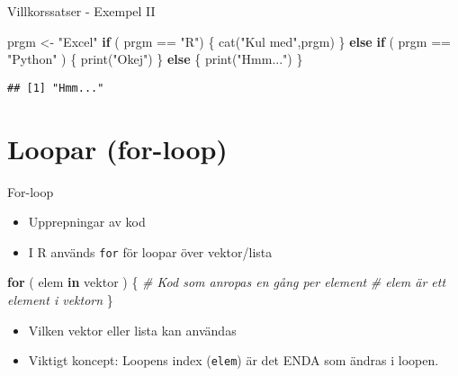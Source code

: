 \documentclass[
  11pt,
  ignorenonframetext,
]{beamer}
\newenvironment{Shaded}{\begin{snugshade}}{\end{snugshade}}
\newcommand{\CommentTok}[1]{\textcolor[rgb]{0.56,0.35,0.01}{\textit{#1}}}
\newcommand{\ControlFlowTok}[1]{\textcolor[rgb]{0.13,0.29,0.53}{\textbf{#1}}}
\newcommand{\FunctionTok}[1]{\textcolor[rgb]{0.00,0.00,0.00}{#1}}
\newcommand{\NormalTok}[1]{#1}
\newcommand{\OtherTok}[1]{\textcolor[rgb]{0.56,0.35,0.01}{#1}}
\newcommand{\SpecialCharTok}[1]{\textcolor[rgb]{0.00,0.00,0.00}{#1}}
\newcommand{\StringTok}[1]{\textcolor[rgb]{0.31,0.60,0.02}{#1}}
\providecommand{\tightlist}{%
  \setlength{\itemsep}{0pt}\setlength{\parskip}{0pt}}
\begin{document}
\begin{frame}[fragile]{Villkorssatser - Exempel II}
\protect\hypertarget{villkorssatser---exempel-ii}{}
\begin{Shaded}
\begin{Highlighting}[]
\NormalTok{prgm }\OtherTok{\textless{}{-}} \StringTok{"Excel"}
\ControlFlowTok{if}\NormalTok{ ( prgm }\SpecialCharTok{==} \StringTok{"R"}\NormalTok{) \{ }
  \FunctionTok{cat}\NormalTok{(}\StringTok{"Kul med"}\NormalTok{,prgm)}
\NormalTok{\} }\ControlFlowTok{else} \ControlFlowTok{if}\NormalTok{ ( prgm }\SpecialCharTok{==} \StringTok{"Python"}\NormalTok{ ) \{}
  \FunctionTok{print}\NormalTok{(}\StringTok{"Okej"}\NormalTok{)}
\NormalTok{\} }\ControlFlowTok{else}\NormalTok{ \{}
  \FunctionTok{print}\NormalTok{(}\StringTok{"Hmm..."}\NormalTok{)}
\NormalTok{\}}
\end{Highlighting}
\end{Shaded}

\pause

\begin{verbatim}
## [1] "Hmm..."
\end{verbatim}
\end{frame}

\hypertarget{loopar-for-loop}{%
\section{Loopar (for-loop)}\label{loopar-for-loop}}

\begin{frame}[fragile]{For-loop}
\protect\hypertarget{for-loop}{}
\begin{itemize}
\tightlist
\item
  Upprepningar av kod
\item
  I R används \texttt{for} för loopar över vektor/lista
\end{itemize}

\begin{Shaded}
\begin{Highlighting}[]
\ControlFlowTok{for}\NormalTok{ ( elem }\ControlFlowTok{in}\NormalTok{ vektor ) \{}
  \CommentTok{\# Kod som anropas en gång per element}
  \CommentTok{\# elem är ett element i vektorn}
\NormalTok{\}}
\end{Highlighting}
\end{Shaded}

\begin{itemize}
\tightlist
\item
  Vilken vektor eller lista kan användas
\item
  Viktigt koncept: Loopens index (\texttt{elem}) är det ENDA som ändras
  i loopen.
\end{itemize}
\end{frame}
\end{document}
